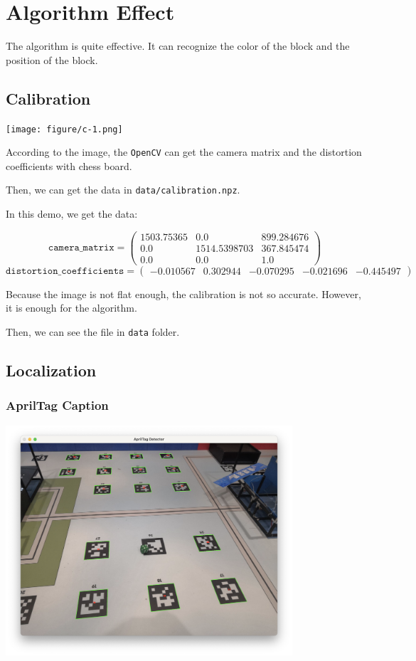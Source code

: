 \documentclass{article}
\begin{document}
\section{Algorithm Effect}

The algorithm is quite effective. It can recognize the color of the block and the position of the block.

\subsection{Calibration}

\texttt{[image: figure/c-1.png]}

According to the image, the \texttt{OpenCV} can get the camera matrix and the distortion coefficients with chess board.

Then, we can get the data in \texttt{data/calibration.npz}.

In this demo, we get the data:

\[
  \texttt{camera\_matrix}=\left(\begin{matrix}
    1503.75365 & 0.0 & 899.284676 \\
    0.0 & 1514.5398703 & 367.845474 \\
    0.0 & 0.0 & 1.0
  \end{matrix}\right)
\]
\[
  \texttt{distortion\_coefficients}=\left(\begin{matrix}
    -0.010567 & 0.302944 & -0.070295 & -0.021696 & -0.445497
  \end{matrix}\right)
\]

Because the image is not flat enough, the calibration is not so accurate. However, it is enough for the algorithm.

Then, we can see the file in \texttt{data} folder.

\subsection{Localization}

\subsubsection{AprilTag Caption}

\includegraphics[width=0.8\textwidth]{figure/l-1.png}
\end{document}
